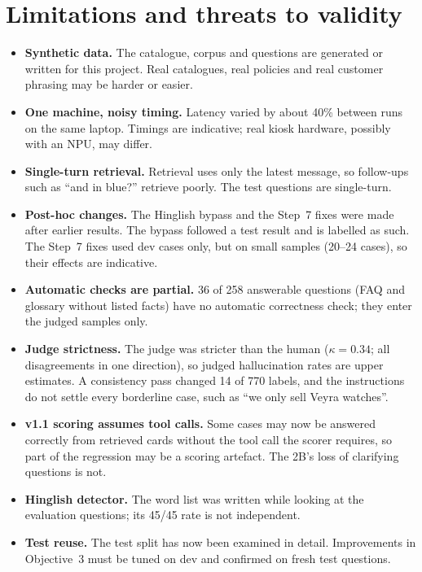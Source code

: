 \documentclass[11pt,a4paper]{article}
\begin{document}
\section{Limitations and threats to validity}\label{sec:limits}
\begin{itemize}
  \item \textbf{Synthetic data.} The catalogue, corpus and questions are generated or written for this project. Real
        catalogues, real policies and real customer phrasing may be harder or easier.
  \item \textbf{One machine, noisy timing.} Latency varied by about 40\% between runs on the same laptop. Timings are
        indicative; real kiosk hardware, possibly with an NPU, may differ.
  \item \textbf{Single-turn retrieval.} Retrieval uses only the latest message, so follow-ups such as ``and in blue?''
        retrieve poorly. The test questions are single-turn.
  \item \textbf{Post-hoc changes.} The Hinglish bypass and the Step~7 fixes were made after earlier results. The
        bypass followed a test result and is labelled as such. The Step~7 fixes used dev cases only, but on small
        samples (20--24 cases), so their effects are indicative.
  \item \textbf{Automatic checks are partial.} 36 of 258 answerable questions (FAQ and glossary without listed facts)
        have no automatic correctness check; they enter the judged samples only.
  \item \textbf{Judge strictness.} The judge was stricter than the human ($\kappa = 0.34$; all disagreements in one
        direction), so judged hallucination rates are upper estimates. A consistency pass changed 14 of 770 labels,
        and the instructions do not settle every borderline case, such as ``we only sell Veyra watches''.
  \item \textbf{v1.1 scoring assumes tool calls.} Some cases may now be answered correctly from retrieved cards without
        the tool call the scorer requires, so part of the regression may be a scoring artefact. The 2B's loss of
        clarifying questions is not.
  \item \textbf{Hinglish detector.} The word list was written while looking at the evaluation questions; its 45/45 rate
        is not independent.
  \item \textbf{Test reuse.} The test split has now been examined in detail. Improvements in Objective~3 must be tuned on
        dev and confirmed on fresh test questions.
\end{itemize}
\end{document}
